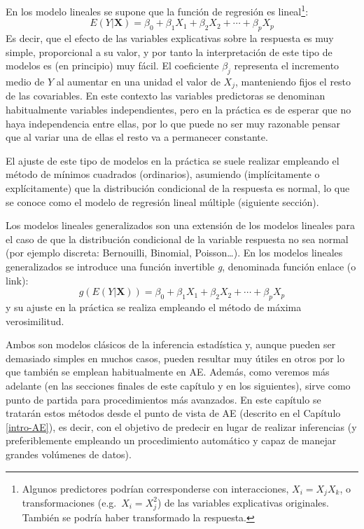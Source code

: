 \documentclass[
  spanish,
]{book}
\theoremstyle{break}
\theoremstyle{definition}
\theoremstyle{definition}
\theoremstyle{definition}
\theoremstyle{remark}
\begin{document}
En los modelo lineales se supone que la función de regresión es lineal\footnote{Algunos predictores podrían corresponderse con interacciones, \(X_i = X_j X_k\), o transformaciones (e.g.~\(X_i = X_j^2\)) de las variables explicativas originales. También se podría haber transformado la respuesta.}:
\[E( Y | \mathbf{X} ) = \beta_{0}+\beta_{1}X_{1}+\beta_{2}X_{2}+\cdots+\beta_{p}X_{p}\]
Es decir, que el efecto de las variables explicativas sobre la respuesta es muy simple, proporcional a su valor, y por tanto la interpretación de este tipo de modelos es (en principio) muy fácil.
El coeficiente \(\beta_j\) representa el incremento medio de \(Y\) al aumentar en una unidad el valor de \(X_j\), manteniendo fijos el resto de las covariables.
En este contexto las variables predictoras se denominan habitualmente variables independientes, pero en la práctica es de esperar que no haya independencia entre ellas, por lo que puede no ser muy razonable pensar que al variar una de ellas el resto va a permanecer constante.

El ajuste de este tipo de modelos en la práctica se suele realizar empleando el método de mínimos cuadrados (ordinarios), asumiendo (implícitamente o explícitamente) que la distribución condicional de la respuesta es normal, lo que se conoce como el modelo de regresión lineal múltiple (siguiente sección).

Los modelos lineales generalizados son una extensión de los modelos lineales para el caso de que la distribución condicional de la variable respuesta no sea normal (por ejemplo discreta: Bernouilli, Binomial, Poisson\ldots).
En los modelos lineales generalizados se introduce una función invertible \emph{g}, denominada función enlace (o link):
\[g\left(E(Y | \mathbf{X} )\right) = \beta_{0}+\beta_{1}X_{1}+\beta_{2}X_{2}+\cdots+\beta_{p}X_{p}\]
y su ajuste en la práctica se realiza empleando el método de máxima verosimilitud.

Ambos son modelos clásicos de la inferencia estadística y, aunque pueden ser demasiado simples en muchos casos, pueden resultar muy útiles en otros por lo que también se emplean habitualmente en AE.
Además, como veremos más adelante (en las secciones finales de este capítulo y en los siguientes), sirve como punto de partida para procedimientos más avanzados.
En este capítulo se tratarán estos métodos desde el punto de vista de AE (descrito en el Capítulo \ref{intro-AE}), es decir, con el objetivo de predecir en lugar de realizar inferencias (y preferiblemente empleando un procedimiento automático y capaz de manejar grandes volúmenes de datos).
\end{document}
